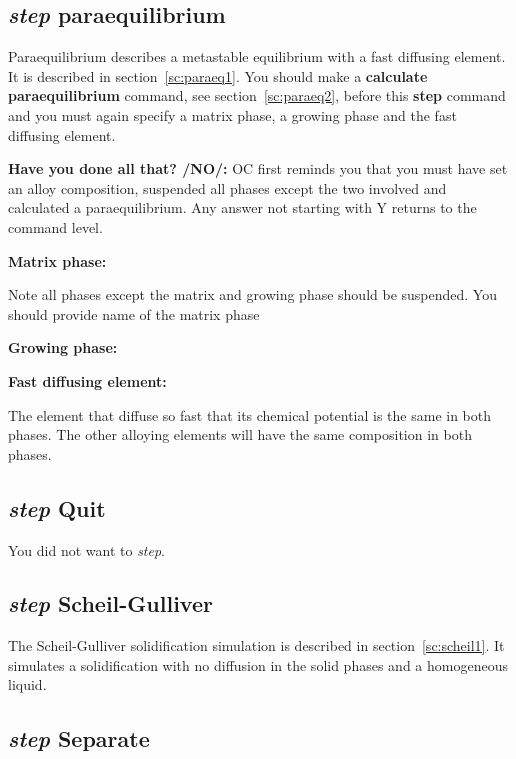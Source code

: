 \documentclass[11pt]{article}
\begin{document}
\hypertarget{Step paraequilibrium}{}
\hypertarget{Step paraeq}{}
\subsection{{\em step} paraequilibrium}\label{sc:paraeq3}

Paraequilibrium describes a metastable equilibrium with a fast
diffusing element.  It is described in section~\ref{sc:paraeq1}.  You
should make a {\bf calculate paraequilibrium} command, see
section~\ref{sc:paraeq2}, before this {\bf step} command and you must
again specify a matrix phase, a growing phase and the fast diffusing
element.

{\bf Have you done all that? /NO/:} OC first reminds you that you must
have set an alloy composition, suspended all phases except the two
involved and calculated a paraequilibrium.  Any answer not starting
with Y returns to the command level.

{\bf Matrix phase:}
              
Note all phases except the matrix and growing phase should be
suspended.  You should provide name of the matrix phase

{\bf Growing phase:}

{\bf Fast diffusing element:}

The element that diffuse so fast that its chemical potential is the
same in both phases.  The other alloying elements will have the same
composition in both phases.


\hypertarget{Step Quit}{}
\subsection{{\em step} Quit}

You did not want to {\em step}.

\hypertarget{Step Scheil}{}
\subsection{{\em step} Scheil-Gulliver}\label{sc:scheil2}

The Scheil-Gulliver solidification simulation is described in
section~\ref{sc:scheil1}.  It simulates a solidification with no
diffusion in the solid phases and a homogeneous liquid.

\hypertarget{Step separate}{}
\subsection{{\em step} Separate}
\end{document}
